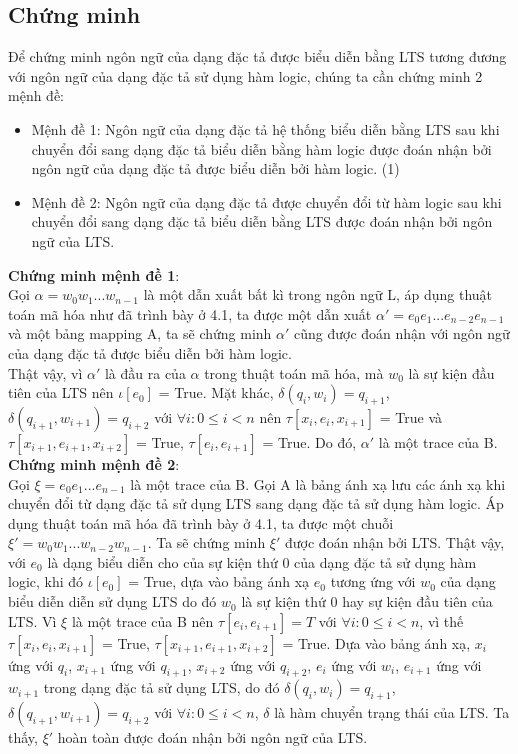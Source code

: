 \documentclass{article}
\begin{document}
\begin{flushleft}
		\section{Chứng minh}
		Để chứng minh ngôn ngữ của dạng đặc tả được biểu diễn bằng LTS tương đương với ngôn ngữ của dạng đặc tả sử dụng hàm logic, chúng ta cần chứng minh 2 mệnh đề:
		\begin{itemize}
			\item Mệnh đề 1: Ngôn ngữ của dạng đặc tả hệ thống biểu diễn bằng LTS sau khi chuyển đổi sang dạng đặc tả biểu diễn bằng hàm logic được đoán nhận bởi ngôn ngữ của dạng đặc tả được biểu diễn bởi hàm logic. (1)\\
			\item Mệnh đề 2: Ngôn ngữ của dạng đặc tả được chuyển đổi từ hàm logic sau khi chuyển đổi sang dạng đặc tả biểu diễn bằng LTS được đoán nhận bởi ngôn ngữ của LTS.
		\end{itemize}
		\textbf{Chứng minh mệnh đề 1}:\\
		Gọi $\alpha = w_0w_1...w_{n-1}$ là một dẫn xuất bất kì trong ngôn ngữ L, áp dụng thuật toán mã hóa như đã trình bày ở 4.1, ta được một dẫn xuất $\alpha' = e_0e_1...e_{n-2}e_{n-1}$ và một bảng mapping A, ta sẽ chứng minh $\alpha'$ cũng được đoán nhận với ngôn ngữ của dạng đặc tả được biểu diễn bởi hàm logic.\\
		Thật vậy, vì $\alpha'$ là đầu ra của $\alpha$ trong thuật toán mã hóa, mà $w_{0}$ là sự kiện đầu tiên của LTS nên $\iota[e_0]$ = True. Mặt khác, $\delta(q_i, w_i) = q_{i+1}$, $\delta(q_{i+1}, w_{i+1}) = q_{i+2}$ với $\forall i: 0 \leq i < n$ nên $\tau[x_i, e_i, x_{i+1}]$ = True và $\tau[x_{i+1}, e_{i+1}, x_{i+2}]$ = True, $\tau[e_i, e_{i+1}]$ = True. Do đó, $\alpha'$ là một trace của B.\\
		\textbf{Chứng minh mệnh đề 2}:\\
		Gọi $\xi = e_0e_1...e_{n-1}$ là một trace của B. Gọi A là bảng ánh xạ lưu các ánh xạ khi chuyển đổi từ dạng đặc tả sử dụng LTS sang dạng đặc tả sử dụng hàm logic. Áp dụng thuật toán mã hóa đã trình bày ở 4.1, ta được một chuỗi $\xi' = w_0w_1...w_{n-2}w_{n-1}$. Ta sẽ chứng minh $\xi'$ được đoán nhận bởi LTS. Thật vậy, với $e_0$ là dạng biểu diễn cho của sự kiện thứ 0 của dạng đặc tả sử dụng hàm logic, khi đó $\iota[e_0]$ = True, dựa vào bảng ánh xạ $e_0$ tương ứng với  $w_{0}$ của dạng biểu diễn diễn sử dụng LTS do đó $w_{0}$ là sự kiện thứ 0 hay sự kiện đầu tiên của LTS. Vì $\xi$ là một trace của B nên $\tau[e_i,e_{i+1}] = T$ với $\forall i: 0 \leq i < n$, vì thế $\tau[x_i, e_i, x_{i+1}]$ = True, $\tau[x_{i+1}, e_{i+1}, x_{i+2}]$ = True. Dựa vào bảng ánh xạ, $x_i$ ứng với $q_i$, $x_{i+1}$ ứng với $q_{i+1}$, $x_{i+2}$ ứng với $q_{i+2}$, $e_i$ ứng với $w_i$, $e_{i+1}$ ứng với $w_{i+1}$ trong dạng đặc tả sử dụng LTS, do đó $\delta(q_{i}, w_{i}) = q_{i+1}$, $\delta(q_{i+1}, w_{i+1}) = q_{i+2}$ với $\forall i: 0 \leq i < n$, $\delta$ là hàm chuyển trạng thái của LTS. Ta thấy, $\xi'$ hoàn toàn được đoán nhận bởi ngôn ngữ của LTS.
	\end{flushleft}
\end{document}
